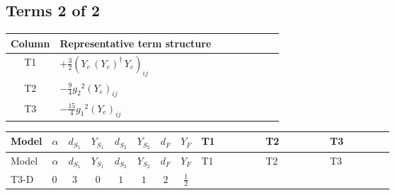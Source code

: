 \documentclass[8pt]{article}
\begin{document}
\begin{landscape}
\subsection*{Terms 2 of 2}
\begin{center}
\begin{tabular}{@{}c >{\raggedright\arraybackslash}p{0.82\linewidth}@{}}
\toprule
Column & Representative term structure \\
\midrule
T1 & \(\displaystyle +\frac{3}{2} \left({Y_e}\,\left({Y_e}\right)^{\dagger}\,{Y_e}\right)_{ij}\) \\
\midrule
T2 & \(\displaystyle -\frac{9}{4} {g_2}^2 \left({Y_e}\right)_{ij}\) \\
\midrule
T3 & \(\displaystyle -\frac{15}{4} {g_1}^2 \left({Y_e}\right)_{ij}\) \\
\midrule
\bottomrule
\end{tabular}
\end{center}
\smallskip
\tiny
\begin{longtable}{@{}llcccccc >{\raggedright\arraybackslash}p{0.21\linewidth} >{\raggedright\arraybackslash}p{0.21\linewidth} >{\raggedright\arraybackslash}p{0.21\linewidth}@{}}
\toprule
Model & $\alpha$ & $d_{S_1}$ & $Y_{S_1}$ & $d_{S_2}$ & $Y_{S_2}$ & $d_F$ & $Y_F$ & T1 & T2 & T3 \\
\midrule
\endfirsthead
\toprule
Model & $\alpha$ & $d_{S_1}$ & $Y_{S_1}$ & $d_{S_2}$ & $Y_{S_2}$ & $d_F$ & $Y_F$ & T1 & T2 & T3 \\
\midrule
\endhead
T3-D & $0$ & $3$ & $0$ & $1$ & $1$ & $2$ & $\frac{1}{2}$ & \scriptsize\adjustbox{max width=\linewidth}{$\begin{gathered} +\frac{3}{2} \left({Y_e}\,\left({Y_e}\right)^{\dagger}\,{Y_e}\right)_{ij}\end{gathered}$} & \scriptsize\adjustbox{max width=\linewidth}{$\begin{gathered} -\frac{9}{4} {g_2}^2 \left({Y_e}\right)_{ij}\end{gathered}$} & \scriptsize\adjustbox{max width=\linewidth}{$\begin{gathered} -\frac{15}{4} {g_1}^2 \left({Y_e}\right)_{ij}\end{gathered}$} \\
\midrule
\bottomrule
\end{longtable}
\clearpage

\end{landscape}
\end{document}
